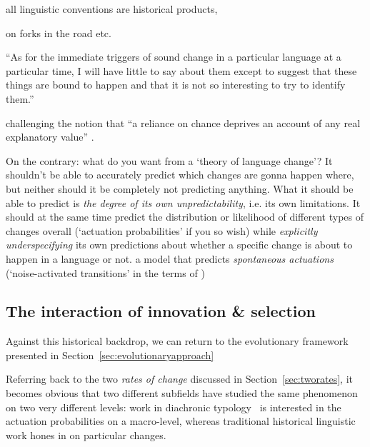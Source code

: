 all linguistic conventions are historical products, 


\citep[ch.7-12]{Labov2010} on forks in the road etc.

``As for the immediate triggers of sound change in a particular language at a particular time, I will have little to say about them except to suggest that these things are bound to happen and that it is not so interesting to try to identify them.''~\citep[p.174]{Ohala1989} %

challenging the notion that ``a reliance on chance deprives an account of any real explanatory value'' \citep[p.44]{Joseph2013}.


On the contrary: what do you want from a `theory of language change'? It shouldn't be able to accurately predict which changes are gonna happen where, but neither should it be completely not predicting anything. What it should be able to predict is \emph{the degree of its own unpredictability}, i.e. its own limitations. It should at the same time predict the distribution or likelihood of different types of changes overall (`actuation probabilities' if you so wish) while \emph{explicitly underspecifying} its own predictions about whether a specific change is about to happen in a language or not.
a model that predicts \emph{spontaneous actuations} (`noise-activated transitions' in the terms of \citealt{Mitchener2016})

\subsection{The interaction of innovation \& selection}

Against this historical backdrop, we can return to the evolutionary framework presented in Section~\ref{sec:evolutionaryapproach}

Referring back to the two \emph{rates of change} discussed in Section~\ref{sec:tworates}, it becomes obvious that two different subfields have studied the same phenomenon on two very different levels: work in diachronic typology~\citep[such as][]{Bickel2015} is interested in the actuation probabilities on a macro-level, whereas traditional historical linguistic work hones in on particular changes.


